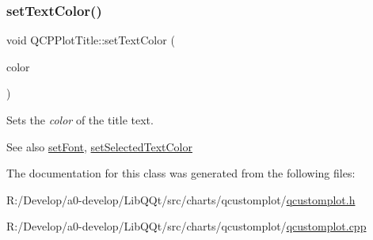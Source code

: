 \subsubsection{\texorpdfstring{set\+Text\+Color()}{setTextColor()}}
{\footnotesize\ttfamily void Q\+C\+P\+Plot\+Title\+::set\+Text\+Color (\begin{DoxyParamCaption}\item[{const Q\+Color \&}]{color }\end{DoxyParamCaption})}

Sets the {\itshape color} of the title text.

\begin{DoxySeeAlso}{See also}
\mbox{\hyperlink{class_q_c_p_plot_title_a199fc7170802ea65006c371875349e37}{set\+Font}}, \mbox{\hyperlink{class_q_c_p_plot_title_a09ffd8c52ac8824d00382f84be391b66}{set\+Selected\+Text\+Color}} 
\end{DoxySeeAlso}


The documentation for this class was generated from the following files\+:\begin{DoxyCompactItemize}
\item 
R\+:/\+Develop/a0-\/develop/\+Lib\+Q\+Qt/src/charts/qcustomplot/\mbox{\hyperlink{qcustomplot_8h}{qcustomplot.\+h}}\item 
R\+:/\+Develop/a0-\/develop/\+Lib\+Q\+Qt/src/charts/qcustomplot/\mbox{\hyperlink{qcustomplot_8cpp}{qcustomplot.\+cpp}}\end{DoxyCompactItemize}
